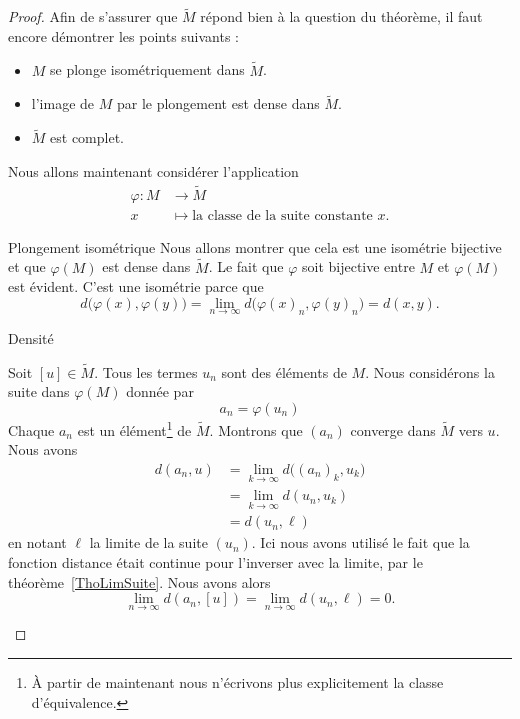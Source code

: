 \begin{proof}
    Afin de s'assurer que \( \tilde M\) répond bien à la question du théorème, il faut encore démontrer les points suivants :
    \begin{itemize}
        \item \( M\) se plonge isométriquement dans \( \tilde M\).
        \item l'image de \( M\) par le plongement est dense dans \( \tilde M\).
        \item \( \tilde M\) est complet.
    \end{itemize}

    Nous allons maintenant considérer l'application
    \begin{equation}
        \begin{aligned}
            \varphi\colon M&\to \tilde M \\
            x&\mapsto \text{la classe de la suite constante } x\text{.}
        \end{aligned}
    \end{equation}
    \begin{subproof}
        \item[Plongement isométrique]
        Nous allons montrer que cela est une isométrie bijective et que \( \varphi(M)\) est dense dans \( \tilde M\). Le fait que \( \varphi\) soit bijective entre \( M\) et \( \varphi(M)\) est évident. C'est une isométrie parce que
        \begin{equation}
            d\big( \varphi(x),\varphi(y) \big)=\lim_{n\to \infty} d\big(\varphi(x)_n,\varphi(y)_n\big)=d(x,y).
        \end{equation}

    \item[Densité]

        Soit \( [u]\in \tilde M\). Tous les termes \( u_n\) sont des éléments de \( M\). Nous considérons la suite dans \( \varphi(M)\) donnée par
        \begin{equation}
            a_n=\varphi(u_n)
        \end{equation}
        Chaque \( a_n\) est un élément\footnote{À partir de maintenant nous n'écrivons plus explicitement la classe d'équivalence.} de \( \tilde M\). Montrons que \( (a_n)\) converge dans \( \tilde M\) vers \( u\). Nous avons
        \begin{subequations}
            \begin{align}
                d(a_n,u)&=\lim_{k\to \infty} d\big( (a_n)_k,u_k \big)\\
                &=\lim_{k\to \infty} d(u_n,u_k)\\
                &=d(u_n,\ell)
            \end{align}
        \end{subequations}
        en notant \( \ell\) la limite de la suite \( (u_n)\). Ici nous avons utilisé le fait que la fonction distance était continue pour l'inverser avec la limite, par le théorème~\ref{ThoLimSuite}. Nous avons alors
        \begin{equation}
            \lim_{n\to \infty} d(a_n,[u])=\lim_{n\to \infty} d(u_n,\ell)=0.
        \end{equation}


\end{subproof}
\end{proof}
